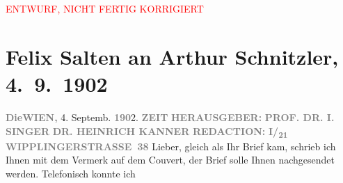 
\begin{center}
            \textcolor{red}{ENTWURF, NICHT FERTIG KORRIGIERT}
                      \end{center}
            
         
         \renewcommand{\erwaehntePersonen}{Personen: Heinrich Kanner, Isidor Singer}
         \renewcommand{\erwaehnteInstitutionen}{Institutionen: Die Zeit}
         \renewcommand{\erwaehnteOrte}{Orte: Wien, Wipplingerstraße}
         \renewcommand{\erwaehnteWerke}{Werke: Die griechische Tänzerin. Novellette, Die kleine Veronika. Novelle}
               \section[Felix Salten an Arthur Schnitzler, 4. 9. 1902]{ Felix Salten an Arthur Schnitzler, 4. 9. 1902}\nopagebreak{}\rehead{ }\begin{ledgroupsized}[t]{13cm}\normalsize\beginnumbering \toendnotes[C]{\smallbreak\pagebreak[2]} 
\toendnotes[C]{\smallbreak}\pstart
           \noindent{}{\pb}\textcolor{gray}{\textbf{Die}}\hfill \textcolor{gray}{\textbf{WIEN,}}{ }4. Septemb. \textcolor{gray}{\textbf{190}}2.\pend
           \pstart
           \textcolor{gray}{\textbf{ZEIT}}\pend
           \pstart
           \textcolor{gray}{\textbf{HERAUSGEBER:}}\pend
           \pstart
           \textcolor{gray}{\textbf{PROF. DR. I. SINGER}}\pend
           \pstart
           \textcolor{gray}{\textbf{DR. HEINRICH KANNER}}\pend
           \pstart
           \textcolor{gray}{\textbf{REDACTION:}}\pend
           \pstart
           \textcolor{gray}{\textbf{I/\textsubscript{21}
                           WIPPLINGERSTRASSE 38}}\pend
           \pstart
           Lieber, gleich als Ihr Brief kam, schrieb ich Ihnen mit dem Vermerk
               auf dem Couvert, der Brief solle Ihnen nachgesendet werden. Telefonisch konnte ich

\end{ledgroupsized}
